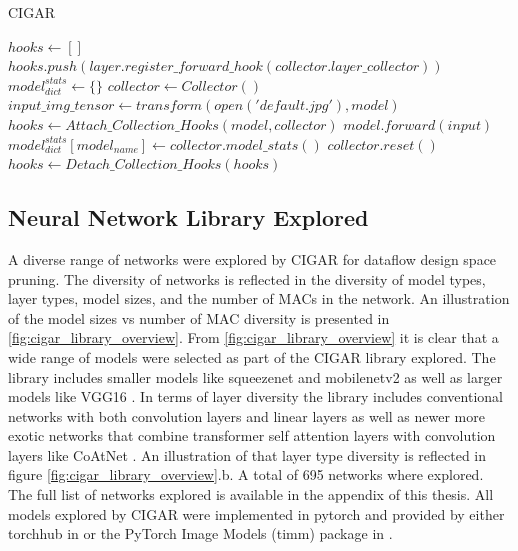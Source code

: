 \begin{algorithm}[H] 
    \caption{\ac{CIGAR}}
    \label{alg:cigar_algo}
    \begin{algorithmic}[1]
    \Statex
        \State $hooks \gets []$
                \State $hooks.push(layer.register\_forward\_hook(collector.layer\_collector))$
            \EndIf 
        \EndFor
    \State {}    
    \EndFunction
    \Statex
        \State $model^{stats}_{dict} \gets \{\}$
        \State $collector \gets Collector()$
            \State $input\_img\_tensor \gets transform(open('default.jpg'), model)$
            \State $hooks \gets Attach\_Collection\_Hooks(model, collector)$
            \State $model.forward(input)$
            \State $model^{stats}_{dict}[model_{name}] \gets collector.model\_stats()$
            \State $collector.reset()$
            \State $hooks \gets Detach\_Collection\_Hooks(hooks)$
        \EndFor
        \State {}
    \EndFunction
    \end{algorithmic}
\end{algorithm}

\subsection{Neural Network Library Explored}
\label{chap:dda:dataflow_dse:pruning:cigar:library}

A diverse range of networks were explored by CIGAR for dataflow design space
pruning. The diversity of networks is reflected in the diversity of model types,
layer types, model sizes, and the number of MACs in the network. An illustration
of the model sizes vs number of MAC diversity is presented in
\autoref{fig:cigar_library_overview}. From \autoref{fig:cigar_library_overview}
it is clear that a wide range of models were selected as part of the CIGAR
library explored. The library includes smaller models like squeezenet and
mobilenetv2 as well as larger models like VGG16 \cite{dnn_is_sota_image}.
In terms of layer diversity the library includes conventional networks with both
convolution layers and linear layers as well as newer more exotic networks that
combine transformer self attention layers with convolution layers like CoAtNet
\cite{xu_co-scale_2021}. An illustration of that layer type diversity is
reflected in figure \autoref{fig:cigar_library_overview}.b. A total of 695 networks where explored.
The full list of networks explored is available in the
appendix of this thesis. All models explored by CIGAR were implemented in
pytorch and provided by either torchhub in \cite{pytorch} or the PyTorch Image
Models (timm) package in \cite{timm}.  

